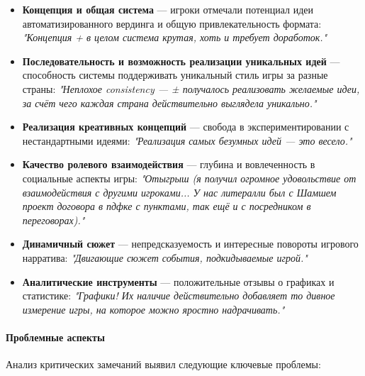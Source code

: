 \begin{itemize}
    \item \textbf{Концепция и общая система} — игроки отмечали потенциал идеи автоматизированного вердинга и общую привлекательность формата: \textit{"{}Концепция + в целом система крутая, хоть и требует доработок."{}}

    \item \textbf{Последовательность и возможность реализации уникальных идей} — способность системы поддерживать уникальный стиль игры за разные страны: \textit{"{}Неплохое consistency — ± получалось реализовать желаемые идеи, за счёт чего каждая страна действительно выглядела уникально."{}}

    \item \textbf{Реализация креативных концепций} — свобода в экспериментировании с нестандартными идеями: \textit{"{}Реализация самых безумных идей — это весело."{}}

    \item \textbf{Качество ролевого взаимодействия} — глубина и вовлеченность в социальные аспекты игры: \textit{"{}Отыгрыш (я получил огромное удовольствие от взаимодействия с другими игроками... У нас литералли был с Шамшем проект договора в пдфке с пунктами, так ещё и с посредником в переговорах)."{}}

    \item \textbf{Динамичный сюжет} — непредсказуемость и интересные повороты игрового нарратива: \textit{"{}Двигающие сюжет события, подкидываемые игрой."{}}

    \item \textbf{Аналитические инструменты} — положительные отзывы о графиках и статистике: \textit{"{}Графики! Их наличие действительно добавляет то дивное измерение игры, на которое можно яростно надрачивать."{}}
\end{itemize}

\paragraph{Проблемные аспекты}

Анализ критических замечаний выявил следующие ключевые проблемы:

